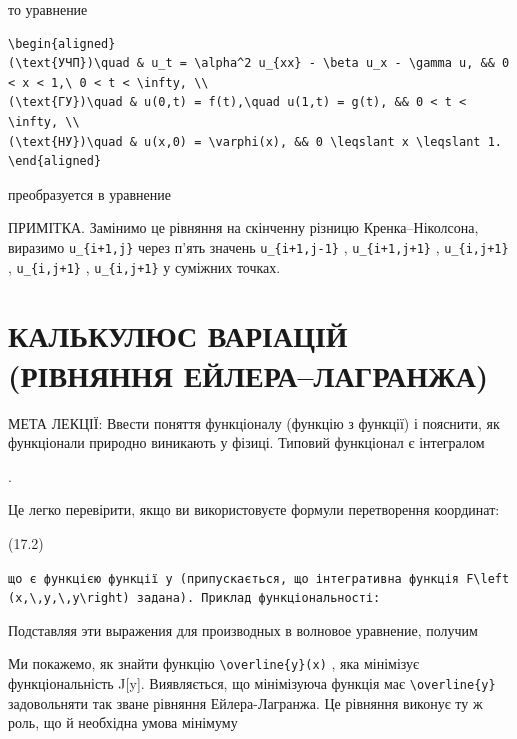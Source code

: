 \documentclass[
  ukrainian,
]{article}
\begin{document}
то уравнение

\begin{verbatim}
\begin{aligned}
(\text{УЧП})\quad & u_t = \alpha^2 u_{xx} - \beta u_x - \gamma u, && 0 < x < 1,\ 0 < t < \infty, \\
(\text{ГУ})\quad & u(0,t) = f(t),\quad u(1,t) = g(t), && 0 < t < \infty, \\
(\text{НУ})\quad & u(x,0) = \varphi(x), && 0 \leqslant x \leqslant 1.
\end{aligned}
\end{verbatim}

преобразуется в уравнение

ПРИМІТКА. Замінимо це рівняння на скінченну різницю Кренка--Ніколсона,
виразимо \texttt{u\_\{i+1,j\}} через п'ять значень
\texttt{u\_\{i+1,j-1\}} , \texttt{u\_\{i+1,j+1\}} ,
\texttt{u\_\{i,j+1\}} , \texttt{u\_\{i,j+1\}} , \texttt{u\_\{i,j+1\}} у
суміжних точках.

\section{КАЛЬКУЛЮС ВАРІАЦІЙ (РІВНЯННЯ
ЕЙЛЕРА--ЛАГРАНЖА)}\label{ux43aux430ux43bux44cux43aux443ux43bux44eux441-ux432ux430ux440ux456ux430ux446ux456ux439-ux440ux456ux432ux43dux44fux43dux43dux44f-ux435ux439ux43bux435ux440ux430ux43bux430ux433ux440ux430ux43dux436ux430}

МЕТА ЛЕКЦІЇ: Ввести поняття функціоналу (функцію з функції) і пояснити,
як функціонали природно виникають у фізиці. Типовий функціонал є
інтегралом

.

Це легко перевірити, якщо ви використовуєте формули перетворення
координат:

(17.2)

\texttt{що\ є\ функцією\ функції\ y\ (припускається,\ що\ інтегративна\ функція\ \textquotesingle{}F\textbackslash{}left(x,\textbackslash{},y,\textbackslash{},y\textquotesingle{}\textbackslash{}right)\textquotesingle{}\ задана).\ Приклад\ функціональності:}

Подставляя эти выражения для производных в волновое уравнение, получим

Ми покажемо, як знайти функцію \texttt{\textbackslash{}overline\{y\}(x)}
, яка мінімізує функціональність J{[}y{]}. Виявляється, що мінімізуюча
функція має \texttt{\textbackslash{}overline\{y\}} задовольняти так
зване рівняння Ейлера-Лагранжа. Це рівняння виконує ту ж роль, що й
необхідна умова мінімуму
\end{document}
